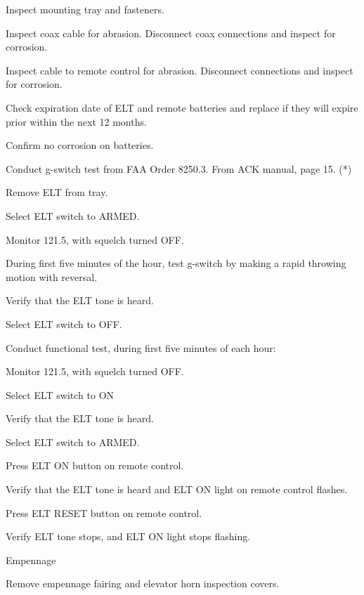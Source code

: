 \begin{enumerate*}
\begin{enumerate*}
		\item Inspect mounting tray and fasteners. 
		\item Inspect coax cable for abrasion. Disconnect coax connections and inspect for corrosion. 
		\item Inspect cable to remote control for abrasion. Disconnect connections and inspect for corrosion. 
		\item Check expiration date of ELT and remote batteries and replace if they will expire prior within the next 12 months. 
		\item Confirm no corrosion on batteries. 
		\item Conduct g-switch test from FAA Order 8250.3. From ACK manual, page 15. (*)
		\begin{enumerate*}
			\item Remove ELT from tray. 
			\item Select ELT switch to ARMED. 
			\item Monitor 121.5, with squelch turned OFF. 
			\item During first five minutes of the hour, test g-switch by making a rapid throwing motion with reversal. 
			\item Verify that the ELT tone is heard. 
			\item Select ELT switch to OFF. 
		\end{enumerate*}
		\item Conduct functional test, during first five minutes of each hour: 
		\begin{enumerate*}
			\item Monitor 121.5, with squelch turned OFF. 
			\item Select ELT switch to ON 
			\item Verify that the ELT tone is heard. 
			\item Select ELT switch to ARMED. 
			\item Press ELT ON button on remote control. 
			\item Verify that the ELT tone is heard and ELT ON light on remote control flashes. 
			\item Press ELT RESET button on remote control. 
			\item Verify ELT tone stops, and ELT ON light stops flashing. 
		\end{enumerate*}
	\end{enumerate*}
	\item{Empennage} 
	\begin{enumerate*}
		\item Remove empennage fairing and elevator horn inspection covers. 

\end{enumerate*}
\end{enumerate*}
